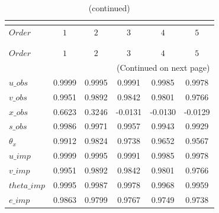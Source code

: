  
\begin{center}
\begin{longtable}{lccccc} 
\caption{COEFFICIENTS OF AUTOCORRELATION}\\
 \label{Table:th_autocorr_matrix}\\
\toprule 
$Order       $	 & 	 $         1$	 & 	 $         2$	 & 	 $         3$	 & 	 $         4$	 & 	 $         5$\\
\midrule \endfirsthead 
\caption{(continued)}\\
 \toprule \\ 
$Order       $	 & 	 $         1$	 & 	 $         2$	 & 	 $         3$	 & 	 $         4$	 & 	 $         5$\\
\midrule \endhead 
\midrule \multicolumn{6}{r}{(Continued on next page)} \\ \bottomrule \endfoot 
\bottomrule \endlastfoot 
$u\_obs      $	 & 	    0.9999	 & 	    0.9995	 & 	    0.9991	 & 	    0.9985	 & 	    0.9978 \\ 
$v\_obs      $	 & 	    0.9951	 & 	    0.9892	 & 	    0.9842	 & 	    0.9801	 & 	    0.9766 \\ 
$x\_obs      $	 & 	    0.6623	 & 	    0.3246	 & 	   -0.0131	 & 	   -0.0130	 & 	   -0.0129 \\ 
$s\_obs      $	 & 	    0.9986	 & 	    0.9971	 & 	    0.9957	 & 	    0.9943	 & 	    0.9929 \\ 
${\theta_x}  $	 & 	    0.9912	 & 	    0.9824	 & 	    0.9738	 & 	    0.9652	 & 	    0.9567 \\ 
$u\_imp      $	 & 	    0.9999	 & 	    0.9995	 & 	    0.9991	 & 	    0.9985	 & 	    0.9978 \\ 
$v\_imp      $	 & 	    0.9951	 & 	    0.9892	 & 	    0.9842	 & 	    0.9801	 & 	    0.9766 \\ 
$theta\_imp  $	 & 	    0.9995	 & 	    0.9987	 & 	    0.9978	 & 	    0.9968	 & 	    0.9959 \\ 
$e\_imp      $	 & 	    0.9863	 & 	    0.9799	 & 	    0.9767	 & 	    0.9749	 & 	    0.9738 \\ 
\end{longtable}
 \end{center}
